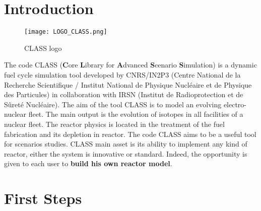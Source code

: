 

\part{Introduction}

    \begin{figure}[H]
    \centering
    \centerline{\texttt{[image: LOGO\_CLASS.png]}}
    \caption{CLASS logo}
    \label{fig:CLASSLogo}
    \end{figure}

    \vspace{2cm}

The code CLASS (\textbf{C}ore \textbf{L}ibrary for \textbf{A}dvanced \textbf{S}cenario \textbf{S}imulation) is a dynamic fuel cycle simulation tool developed by CNRS/IN2P3 (Centre National de la Recherche Scientifique / Institut National de Physique Nucléaire et de Physique des Particules) in collaboration with IRSN (Institut de Radioprotection et de Sûreté Nucléaire). The aim of the tool CLASS is to model an evolving electro-nuclear fleet. The main output is the evolution of isotopes in all facilities of a nuclear fleet. The reactor physics is located in the treatment of the fuel fabrication and its depletion in reactor. The code CLASS aims to be a useful tool for scenarios studies. CLASS main asset is its ability to implement any kind of reactor, either the system is innovative or standard. Indeed, the opportunity is given to each user to \textbf{build his own reactor model}.

\part{First Steps}
